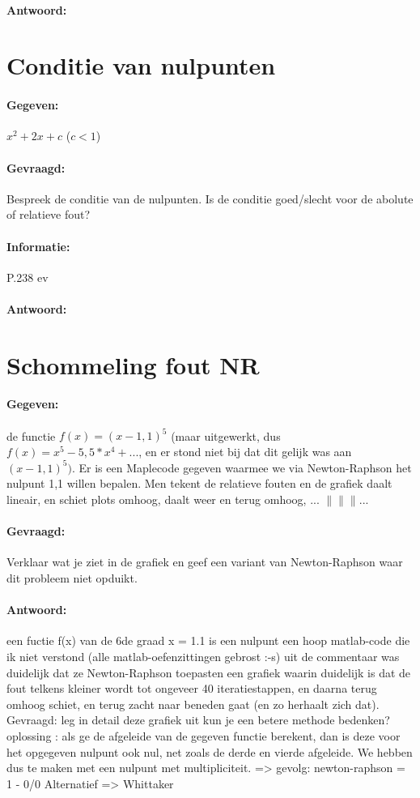 \documentclass[12pt]{article}
\begin{document}
\paragraph{Antwoord:}

\newpage

\section{Conditie van nulpunten}
\paragraph{Gegeven:} $x^2+2x+c$ ($c<1$)
\paragraph{Gevraagd:} Bespreek de conditie van de nulpunten. Is de conditie goed/slecht voor de abolute of relatieve fout?
\paragraph{Informatie:} P.238 ev
\paragraph{Antwoord:}

\newpage

\section{Schommeling fout NR}
\paragraph{Gegeven:} de functie $f(x) = (x - 1,1)^5$ (maar uitgewerkt, dus $f(x) = x^5 - 5,5*x^4 + ...$, en er stond niet bij dat dit gelijk was aan $(x-1,1)^5)$. Er is een Maplecode gegeven waarmee we via Newton-Raphson het nulpunt 1,1 willen bepalen. Men tekent de relatieve fouten en de grafiek daalt lineair, en schiet plots omhoog, daalt weer en terug omhoog, ... $\|\|\|...$
\paragraph{Gevraagd:} Verklaar wat je ziet in de grafiek en geef een variant van Newton-Raphson waar dit probleem niet opduikt.
\paragraph{Antwoord:}
een fuctie f(x) van de 6de graad x = 1.1 is een nulpunt een hoop matlab-code die ik niet verstond (alle matlab-oefenzittingen gebrost :-s) uit de commentaar was duidelijk dat ze Newton-Raphson toepasten een grafiek waarin duidelijk is dat de fout telkens kleiner wordt tot ongeveer 40 iteratiestappen, en daarna terug omhoog schiet, en terug zacht naar beneden gaat (en zo herhaalt zich dat).
Gevraagd: leg in detail deze grafiek uit kun je een betere methode bedenken?
oplossing : als ge de afgeleide van de gegeven functie berekent, dan is deze voor het opgegeven nulpunt ook nul, net zoals de derde en vierde afgeleide. We hebben dus te maken met een nulpunt met multipliciteit. => gevolg: newton-raphson = 1 - 0/0 Alternatief => Whittaker
\newpage
\end{document}
